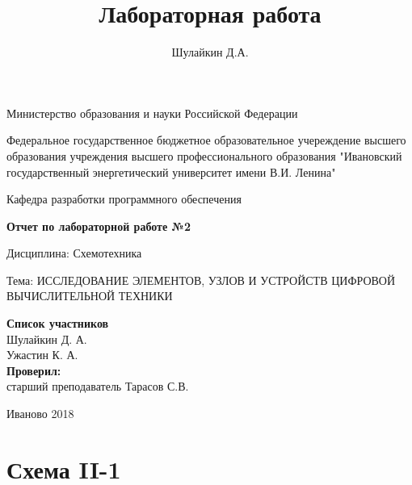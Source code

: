 \documentclass[a4paper]{article}
\title{Лабораторная работа}
\author{Шулайкин Д.А.}
\begin{document}
\onehalfspacing
\thispagestyle{empty}
\begin{center}
Министерство образования и науки Российской Федерации
\vspace{10pt}

Федеральное государственное бюджетное образовательное учереждение высшего образования учреждения высшего профессионального образования "Ивановский государственный энергетический университет имени В.И. Ленина"
\vspace{40pt}

Кафедра разработки программного обеспечения
\vspace{40pt}

\textbf{Отчет по лабораторной работе №2}

Дисциплина: Схемотехника

Тема: ИССЛЕДОВАНИЕ ЭЛЕМЕНТОВ, УЗЛОВ И УСТРОЙСТВ ЦИФРОВОЙ ВЫЧИСЛИТЕЛЬНОЙ ТЕХНИКИ

\end{center}

\vspace{310pt}
\begin{flushright}
\textbf{Список участников} \\
Шулайкин Д. А. \\
Ужастин К. А. \\

\textbf{Проверил:} \\
старший преподаватель Тарасов С.В.
\end{flushright}
\vspace{40pt}
\begin{center}
Иваново 2018
\end{center}
\pagebreak

\section{Схема II-1}
\end{document}
